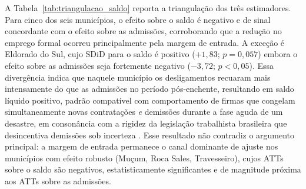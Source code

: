 \documentclass[a4paper,12pt]{article}
\begin{document}
A Tabela~\ref{tab:triangulacao_saldo} reporta a triangulação dos três estimadores.
Para cinco dos seis municípios, o efeito sobre o saldo é negativo e de sinal
concordante com o efeito sobre as admissões, corroborando que a redução no
emprego formal ocorreu principalmente pela margem de entrada. A exceção é
Eldorado do Sul, cujo SDiD para o saldo é positivo ($+1{,}83$; $p = 0{,}057$)
embora o efeito sobre as admissões seja fortemente negativo ($-3{,}72$; $p < 0{,}05$).
Essa divergência indica que naquele município os desligamentos recuaram mais intensamente
do que as admissões no período pós-enchente, resultando em saldo líquido positivo,
padrão compatível com comportamento de firmas que congelam simultaneamente novas
contratações \emph{e} demissões durante a fase aguda de um desastre, em consonância
com a rigidez da legislação trabalhista brasileira que desincentiva demissões sob
incerteza \cite{teixeira2024, krein2012}. Esse resultado não contradiz o argumento principal:
a margem de entrada permanece o canal dominante de ajuste nos municípios com efeito
robusto (Muçum, Roca Sales, Travesseiro), cujos ATTs sobre o saldo são negativos,
estatisticamente significantes e de magnitude próxima aos ATTs sobre as admissões.
\end{document}
